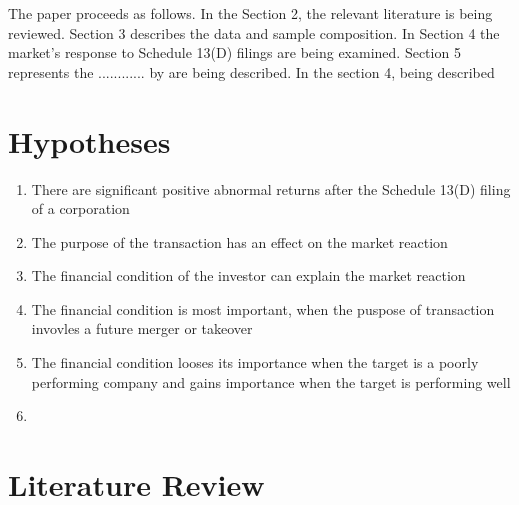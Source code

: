 \documentclass[12pt]{article}
\begin{document}
The paper proceeds as follows. In the Section 2, the relevant literature is being reviewed. Section 3 describes the data and sample composition. In Section 4 the market's response to Schedule 13(D) filings are being examined. Section 5 represents the ............
by  are being described.  In the section 4, being described 

\section{Hypotheses}

\begin{enumerate}
	\item There are significant positive abnormal returns after the Schedule 13(D) filing of a corporation
	\item The purpose of the transaction has an effect on the market reaction 
	\item The financial condition of the investor can explain the market reaction
	\item The financial condition is most important, when the puspose of transaction invovles a future merger or takeover
	\item The financial condition looses its importance when the target is a poorly performing company and gains importance when the target is performing well 
	\item 
\end{enumerate}

\section{Literature Review}
\end{document}
